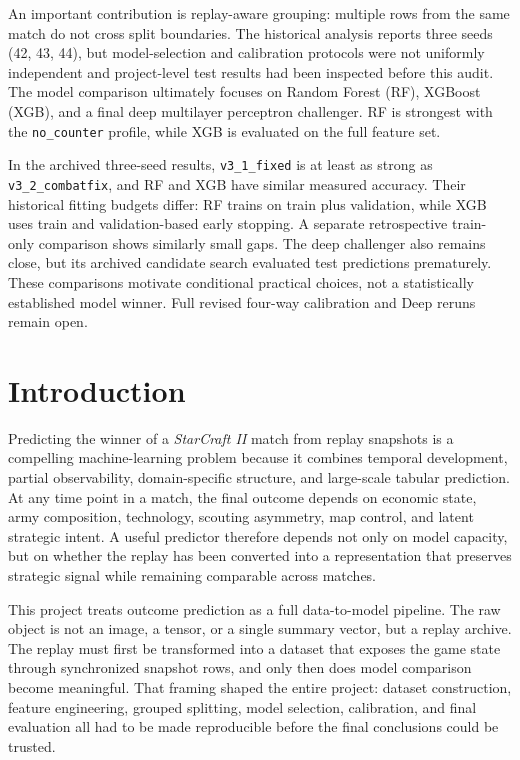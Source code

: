 \documentclass[11pt,a4paper]{article}
\begin{document}
An important contribution is replay-aware grouping: multiple rows from the same match do not cross split boundaries. The historical analysis reports three seeds (42, 43, 44), but model-selection and calibration protocols were not uniformly independent and project-level test results had been inspected before this audit. The model comparison ultimately focuses on Random Forest (RF), XGBoost (XGB), and a final deep multilayer perceptron challenger. RF is strongest with the \texttt{no\_counter} profile, while XGB is evaluated on the full feature set.

In the archived three-seed results, \texttt{v3\_1\_fixed} is at least as strong as \texttt{v3\_2\_combatfix}, and RF and XGB have similar measured accuracy. Their historical fitting budgets differ: RF trains on train plus validation, while XGB uses train and validation-based early stopping. A separate retrospective train-only comparison shows similarly small gaps. The deep challenger also remains close, but its archived candidate search evaluated test predictions prematurely. These comparisons motivate conditional practical choices, not a statistically established model winner. Full revised four-way calibration and Deep reruns remain open.

\tableofcontents
\newpage

\section{Introduction}
Predicting the winner of a \emph{StarCraft II} match from replay snapshots is a compelling machine-learning problem because it combines temporal development, partial observability, domain-specific structure, and large-scale tabular prediction. At any time point in a match, the final outcome depends on economic state, army composition, technology, scouting asymmetry, map control, and latent strategic intent. A useful predictor therefore depends not only on model capacity, but on whether the replay has been converted into a representation that preserves strategic signal while remaining comparable across matches.

This project treats outcome prediction as a full data-to-model pipeline. The raw object is not an image, a tensor, or a single summary vector, but a replay archive. The replay must first be transformed into a dataset that exposes the game state through synchronized snapshot rows, and only then does model comparison become meaningful. That framing shaped the entire project: dataset construction, feature engineering, grouped splitting, model selection, calibration, and final evaluation all had to be made reproducible before the final conclusions could be trusted.
\end{document}

